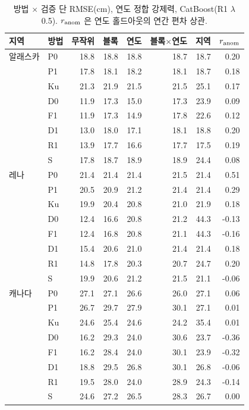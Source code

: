 \begin{table}[H]\centering\small\caption{방법 $\times$ 검증 단 RMSE(cm), 연도 정합 강제력, CatBoost(R1 $\lambda$ 0.5). $r_{\rm anom}$ 은 연도 홀드아웃의 연간 편차 상관.}
\begin{tabular}{llrrrrrr}\toprule 지역 & 방법 & 무작위 & 블록 & 연도 & 블록$\times$연도 & 지역 & $r_{\rm anom}$ \\ \midrule
알래스카 & P0 & 18.8 & 18.8 & 18.8 & 18.7 & 18.7 & 0.20 \\
 & P1 & 17.8 & 18.1 & 18.2 & 18.1 & 18.7 & 0.18 \\
 & Ku & 21.3 & 21.9 & 21.5 & 21.5 & 25.1 & 0.17 \\
 & D0 & 11.9 & 17.3 & 15.0 & 17.3 & 23.9 & 0.09 \\
 & F1 & 11.9 & 17.3 & 14.9 & 17.8 & 22.6 & 0.12 \\
 & D1 & 13.0 & 18.0 & 17.1 & 18.1 & 18.8 & 0.20 \\
 & R1 & 13.9 & 17.7 & 16.6 & 17.7 & 17.5 & 0.19 \\
 & S & 17.8 & 18.7 & 18.9 & 18.9 & 24.4 & 0.08 \\
\midrule
레나 & P0 & 21.4 & 21.4 & 21.4 & 21.5 & 21.4 & 0.51 \\
 & P1 & 20.5 & 20.9 & 21.2 & 21.4 & 21.4 & 0.29 \\
 & Ku & 19.9 & 20.4 & 20.8 & 21.0 & 21.9 & 0.18 \\
 & D0 & 12.4 & 16.6 & 20.8 & 21.2 & 44.3 & -0.13 \\
 & F1 & 12.4 & 16.8 & 20.8 & 21.1 & 44.3 & -0.16 \\
 & D1 & 15.4 & 20.6 & 21.0 & 21.4 & 21.4 & 0.18 \\
 & R1 & 14.8 & 17.8 & 20.3 & 20.7 & 24.7 & 0.20 \\
 & S & 19.9 & 20.6 & 21.2 & 21.5 & 21.1 & -0.06 \\
\midrule
캐나다 & P0 & 27.1 & 27.1 & 26.6 & 26.0 & 27.1 & 0.06 \\
 & P1 & 26.7 & 29.7 & 27.9 & 30.1 & 27.1 & 0.01 \\
 & Ku & 24.6 & 25.4 & 24.6 & 24.2 & 35.4 & 0.01 \\
 & D0 & 16.2 & 29.3 & 24.0 & 30.6 & 23.7 & -0.36 \\
 & F1 & 16.2 & 28.4 & 24.0 & 30.1 & 23.9 & -0.32 \\
 & D1 & 18.8 & 29.5 & 26.8 & 30.1 & 26.8 & -0.06 \\
 & R1 & 19.5 & 28.0 & 24.0 & 28.9 & 24.3 & -0.14 \\
 & S & 24.6 & 27.2 & 26.5 & 28.3 & 26.7 & 0.00 \\
\bottomrule
\end{tabular}\end{table}